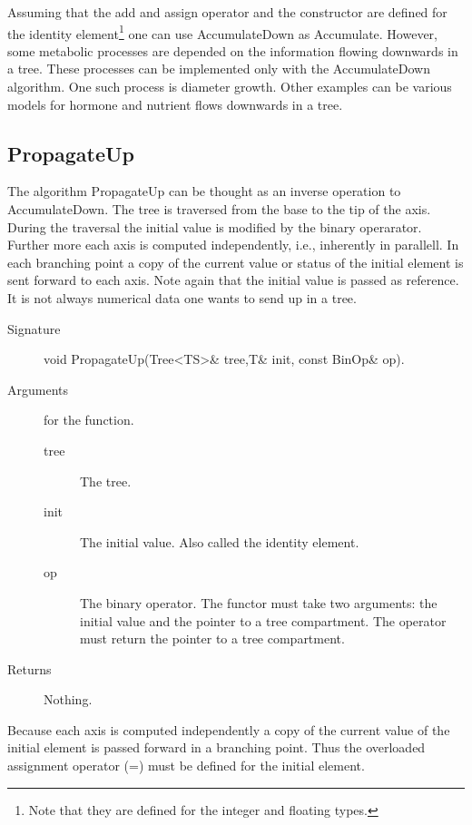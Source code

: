 Assuming  that the  add and  assign operator  and the  constructor are
defined for  the identity element\footnote{Note that  they are defined
for  the integer  and floating  types.} one  can use  AccumulateDown as
Accumulate.   However, some  metabolic processes  are depended  on the
information  flowing downwards  in  a tree.   These  processes can  be
implemented only with the  AccumulateDown algorithm.  One such process
is diameter growth.  Other examples  can be various models for hormone
and nutrient flows downwards in a tree.

\subsection{PropagateUp}

The algorithm PropagateUp  can be thought as  an inverse  operation to
AccumulateDown. The tree is traversed from the  base to the tip of the
axis. During the traversal the initial value is modified by the binary
operarator. Further  more each axis  is computed  independently, i.e.,
inherently in parallell. In each branching point a copy of the current
value or status of the  initial element is  sent forward to each axis.
Note again  that the initial value  is passed as  reference. It is not
always numerical data one wants to send up in a tree.

\begin{description}
   \item [Signature] void PropagateUp(Tree<TS>\& tree,T\& init, const BinOp\& op).
   \item [Arguments] for the function.
     \begin{description}
        \item [tree] The tree.
        \item [init] The initial value. Also called the identity
     element.
        \item [op] The binary operator. The functor must take two
     arguments: the initial value and the pointer to a tree compartment. The
     operator must return the pointer to a tree compartment.
     \end{description} 
   \item[Returns] Nothing.
\end{description} 
 
Because  each  axis is computed   independently a copy of  the current
value  of  the initial  element   is  passed forward   in a  branching
point. Thus the overloaded assignment operator (=) must be defined for
the initial element.


